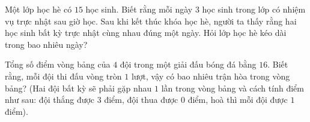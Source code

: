 \begin{ex}%
	Một lớp học hè có $15$ học sinh. Biết rằng mỗi ngày $3$ học sinh trong lớp có nhiệm vụ trực nhật sau giờ học. Sau khi kết thúc khóa học hè, người ta thấy rằng hai học sinh bất kỳ trực nhật cùng nhau đúng một ngày. Hỏi lớp học hè kéo dài trong bao nhiêu ngày?
\end{ex}

%

\begin{ex}%
	Tổng số điểm vòng bảng của $4$ đội trong một giải đấu bóng đá bằng $16$. Biết rằng, mỗi đội thi đấu vòng tròn $1$ lượt, vậy có bao nhiêu trận hòa trong vòng bảng? (Hai đội bất kỳ sẽ phải gặp nhau $1$ lần trong vòng bảng và cách tính điểm như sau: đội thắng được $3$ điểm, đội thua được $0$ điểm, hoà thì mỗi đội được $1$ điểm).
\end{ex}

